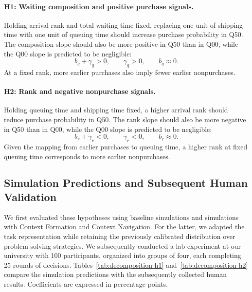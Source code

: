 \documentclass[12pt,letterpaper]{article}
\begin{document}
\paragraph{H1: Waiting composition and positive purchase signals.}
Holding arrival rank and total waiting time fixed, replacing
one unit of shipping time with one unit of queuing time should
increase purchase probability in Q50. The composition slope
should also be more positive in Q50 than in Q00, while the Q00
slope is predicted to be negligible:
\begin{equation}
b_q+\gamma_q>0,
\qquad
\gamma_q>0,
\qquad
b_q\approx 0.
\label{eq:decomposition-h1}
\end{equation}
At a fixed rank, more earlier purchases also imply fewer earlier
nonpurchases.

\paragraph{H2: Rank and negative nonpurchase signals.}
Holding queuing time and shipping time fixed, a higher arrival
rank should reduce purchase probability in Q50. The rank slope
should also be more negative in Q50 than in Q00, while the Q00
slope is predicted to be negligible:
\begin{equation}
b_r+\gamma_r<0,
\qquad
\gamma_r<0,
\qquad
b_r\approx 0.
\label{eq:decomposition-h2}
\end{equation}
Given the mapping from earlier purchases to queuing time,
a higher rank at fixed queuing time corresponds to more earlier
nonpurchases.

\subsection{Simulation Predictions and Subsequent Human Validation}
\label{app:decomposition-results}

We first evaluated these hypotheses using baseline simulations
and simulations with Context Formation and Context Navigation.
For the latter, we adapted the task representation while retaining
the previously calibrated distribution over problem-solving
strategies. We subsequently conducted a lab experiment at
our university with 100 participants,
organized into groups of four, each completing 25 rounds of
decisions. Tables~\ref{tab:decomposition-h1}
and~\ref{tab:decomposition-h2} compare the simulation predictions
with the
subsequently collected human results. Coefficients are expressed
in percentage points.
\end{document}
